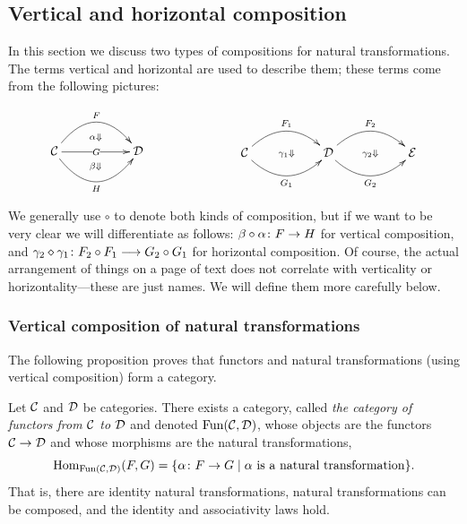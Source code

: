 \subsection{Vertical and horizontal composition}\label{sec:vert and hor}

In this section we discuss two types of compositions for natural transformations. The terms vertical and horizontal are used to describe them; these terms come from the following pictures:

$$
\parbox{1in}{\xymatrix{&\ar@{}[d]|(.65){\alpha\Down}\\\mcC\ar@/^2pc/[rr]^F\ar[rr]|G\ar@/_2pc/[rr]_H&&\mcD\\&\ar@{}[u]|(.65){\beta\Down}}}
\hspace{1in}
\parbox{2in}{\xymatrix{\mcC\ar@/^1.5pc/[rr]^{F_1}\ar@{}[rr]|{\gamma_1\Down}\ar@/_1.5pc/[rr]_{G_1}&&\mcD\ar@/^1.5pc/[rr]^{F_2}\ar@{}[rr]|{\gamma_2\Down}\ar@/_1.5pc/[rr]_{G_2}&&\mcE}}
$$
We generally use $\circ$ to denote both kinds of composition, but if we want to be very clear we will differentiate as follows: $\beta\circ\alpha\colon F\rightarrow H$ for vertical composition, and $\gamma_2\diamond\gamma_1\colon F_2\circ F_1\longrightarrow G_2\circ G_1$ for horizontal composition. Of course, the actual arrangement of things on a page of text does not correlate with verticality or horizontality—these are just names. We will define them more carefully below.


\subsubsection{Vertical composition of natural transformations}

The following proposition proves that functors and natural transformations (using vertical composition) form a category.

\begin{proposition}\label{prop:Fun(C,D)}

Let $\mathcal{C}$ and $\mathcal{D}$ be categories. There exists a category, called {\em the category of functors from $\mathcal{C}$ to $\mathcal{D}$} and denoted $\textnormal{Fun}(\mathcal{C},\mathcal{D})$, whose objects are the functors $\mathcal{C}\rightarrow\mathcal{D}$ and whose morphisms are the natural transformations,
$$\textnormal{Hom}_{\textnormal{Fun}(\mathcal{C},\mathcal{D})}(F,G)=\{\alpha\colon F\rightarrow G{\;|\;}\alpha\textnormal{ is a natural transformation}\}.$$That is, there are identity natural transformations, natural transformations can be composed, and the identity and associativity laws hold.

\end{proposition}

